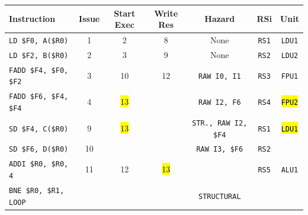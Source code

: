 \begin{enumerate}
    \begin{table}[!htp]
        \centering
        \begin{adjustbox}{width={\textwidth},totalheight={\textheight},keepaspectratio}
        \begin{tabular}{@{} l c c c c c c @{}}
            \toprule
            \textbf{Instruction} & \textbf{Issue} & \textbf{Start Exec} & \textbf{Write Res} & \textbf{Hazard} & \textbf{RSi} & \textbf{Unit} \\
            \midrule
            \texttt{LD \$F0, A(\$R0)}       & 1 & 2 & 8 & None  & \texttt{RS1}   & \texttt{LDU1}  \\ [.5em]
            \texttt{LD \$F2, B(\$R0)}       & 2 & 3 & 9 & None  & \texttt{RS2}   & \texttt{LDU2}  \\ [.5em]
            \texttt{FADD \$F4, \$F0, \$F2}  & 3 & 10 & 12 & \texttt{RAW I0, I1} & \texttt{RS3} & \texttt{FPU1} \\ [.5em]
            \texttt{FADD \$F6, \$F4, \$F4}  & 4 & \hl{13} &   & \texttt{RAW I2, F6} & \texttt{RS4} & \hl{\texttt{FPU2}} \\ [.5em]
            \texttt{SD \$F4, C(\$R0)}       & 9 & \hl{13} &   & \texttt{STR., RAW I2, \$F4} & \texttt{RS1} & \hl{\texttt{LDU1}} \\ [.5em]
            \texttt{SD \$F6, D(\$R0)}       & 10 &   &   & \texttt{RAW I3, \$F6} & \texttt{RS2} &       \\ [.5em]
            \texttt{ADDI \$R0, \$R0, 4}     & 11 & 12 & \hl{13} &       & \texttt{RS5} & \texttt{ALU1} \\ [.5em]
            \texttt{BNE \$R0, \$R1, LOOP}   &   &   &   & \texttt{STRUCTURAL} &       &       \\
            \bottomrule
        \end{tabular}
        \end{adjustbox}
    \end{table}
    

\end{enumerate}

